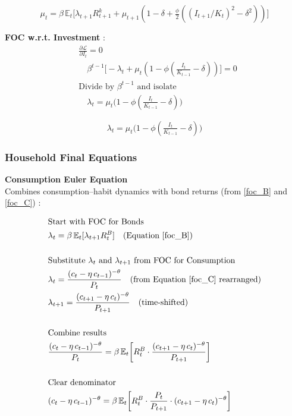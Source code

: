 \documentclass[11pt,preprint]{elsarticle}
\numberwithin{equation}{section}
\numberwithin{figure}{section}
\numberwithin{table}{section}
\begin{document}
\begin{equation}\label{foc_K}
\boxed{\mu_t = \beta\,\mathbb{E}_t\bigl[\lambda_{t+1}R^k_{t+1} + \mu_{t+1}(1-\delta + \tfrac{\phi}{2}((I_{t+1}/K_t)^2 - \delta^2))\bigr]}
\end{equation}

\textbf{FOC w.r.t. Investment} : \begin{align*}
  & \frac{\partial \mathcal{L}}{\partial I_t} = 0 \\
  & \quad \beta^{t-1}\bigl[-\lambda_t + \mu_t(1 - \phi(\tfrac{I_t}{K_{t-1}} - \delta))\bigr] = 0 \\[6pt]
  & \text{Divide by }\beta^{t-1}\text{ and isolate} \\
  & \quad \lambda_t = \mu_t\bigl(1 - \phi(\tfrac{I_t}{K_{t-1}} - \delta)\bigr)
\end{align*}

\begin{equation}\label{foc_I}
\boxed{\lambda_t = \mu_t\bigl(1 - \phi(\tfrac{I_t}{K_{t-1}} - \delta)\bigr)}
\end{equation}

\subsubsection{Household Final
Equations}\label{household-final-equations}

\textbf{Consumption Euler Equation}\\
Combines consumption--habit dynamics with bond returns (from
\eqref{foc_B} and \eqref{foc_C}) :

\begin{align*}
& \text{Start with FOC for Bonds} \\
& \lambda_t = \beta\,\mathbb{E}_t[\lambda_{t+1}R_t^B] \quad \text{(Equation \ref{foc_B})} \\
& \\
& \text{Substitute } \lambda_t \text{ and } \lambda_{t+1} \text{ from FOC for Consumption} \\
& \lambda_t = \frac{(c_t - \eta\,c_{t-1})^{-\theta}}{P_t} \quad \text{(from Equation \ref{foc_C} rearranged)} \\
& \lambda_{t+1} = \frac{(c_{t+1} - \eta\,c_t)^{-\theta}}{P_{t+1}} \quad \text{(time-shifted)} \\
& \\
& \text{Combine results} \\
& \frac{(c_t - \eta\,c_{t-1})^{-\theta}}{P_t} = \beta\,\mathbb{E}_t\!\left[ R_t^B \cdot \frac{(c_{t+1} - \eta\,c_t)^{-\theta}}{P_{t+1}} \right] \\
& \\
& \text{Clear denominator} \\
& (c_t - \eta\,c_{t-1})^{-\theta} = \beta\,\mathbb{E}_t\!\left[ R_t^B \cdot \frac{P_t}{P_{t+1}} \cdot (c_{t+1} - \eta\,c_t)^{-\theta} \right]
\end{align*}
\end{document}
